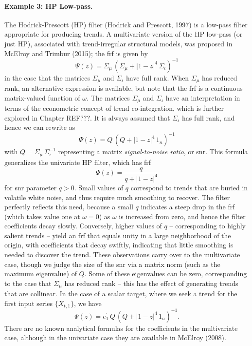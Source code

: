 \documentclass[a4paper]{book}
\begin{document}
\paragraph{Example 3: HP Low-pass.}  The Hodrick-Prescott (HP) filter (Hodrick
and Prescott, 1997) is a low-pass filter appropriate for producing trends.
 A multivariate version of the HP low-pass (or just HP), 
 associated with trend-irregular structural models,
 was proposed in McElroy and Trimbur (2015); the frf is given by
\[
   \Psi (z) = \Sigma_{\mu} \, { \left( \Sigma_{\mu} + {|1 - z|}^4 \, \Sigma_{\iota} 
	\right) }^{-1}
\]
 in the case that the matrices $\Sigma_{\mu}$ and $\Sigma_{\iota}$ have full rank.  
  When $\Sigma_{\mu}$ has reduced rank, an alternative expression is available,
 but note that the frf is a continuous matrix-valued function of $\omega$.
The matrices $\Sigma_{\mu}$ and $\Sigma_{\iota}$ have an interpretation in terms
 of the econometric concept of trend co-integration, which is further explored
 in Chapter REF???.  It is always assumed that $\Sigma_{\iota}$ has full rank, and hence 
 we can rewrite as
\[
  \Psi (z) = Q \, { \left( Q + {| 1 - z|}^4 \, 1_n \right) }^{-1}
\]
 with $Q = \Sigma_{\mu} \, \Sigma_{\iota}^{-1}$ representing a matrix
 {\em signal-to-noise ratio}, or snr.  This formula 
  generalizes the univariate HP filter, which has frf
\[
 \Psi (z) = \frac{ q}{ q + {| 1 - z|}^4 }
\]
 for snr parameter $q > 0$.  Small values of $q$ correspond to trends that are
 buried in volatile white noise, and thus require much smoothing to recover.
 The filter perfectly reflects this need, because a small $q$ indicates a steep
 drop in the frf (which takes value one at $\omega = 0$) as $\omega$ is increased
 from zero, and hence the filter coefficients decay slowly.  Conversely, higher values
 of $q$ -- corresponding to highly salient trends -- yield an frf that equals unity
 in a large neighborhood of the origin, with coefficients that decay swiftly,
 indicating that little smoothing is needed to discover the trend.  These observations
 carry over to the multivariate case, though we judge the size of the snr via a
 matrix norm (such as the maximum eigenvalue) of $Q$.  Some of these eigenvalues can be
 zero, corresponding to the case that $\Sigma_{\mu}$ has reduced rank -- this has the
 effect of generating trends that are collinear.  In the case of a scalar target,
 where we seek a trend for the first input series $\{ X_{t,1} \}$,  we have 
\[
  \Psi (z) = e_1^{\prime} \, Q \, { \left( Q + {| 1 - z|}^4 \, 1_n \right) }^{-1}.
\]
 There are no known analytical formulas for the coefficients in the multivariate case,
 although in the univariate case they are available in McElroy (2008).
\end{document}
